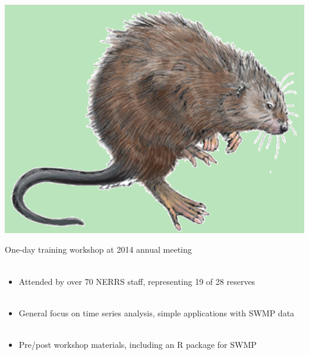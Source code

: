 \documentclass[serif]{beamer}\usepackage[]{graphicx}\usepackage[]{color}
\begin{document}
\begin{frame}{\includegraphics[width=0.05\paperwidth]{fig/muskrat.png}\hspace{0.07in}{\bf Genesis of SWMPrats}}
\centerline{}
\vspace{0.2in}
One-day training workshop at 2014 annual meeting \\~\\
\begin{itemize}
\item Attended by over 70 NERRS staff, representing 19 of 28 reserves \\~\\
\item General focus on time series analysis, simple applications with SWMP data \\~\\
\item Pre/post workshop materials, including an R package for SWMP
\end{itemize}
\end{frame}
\end{document}
